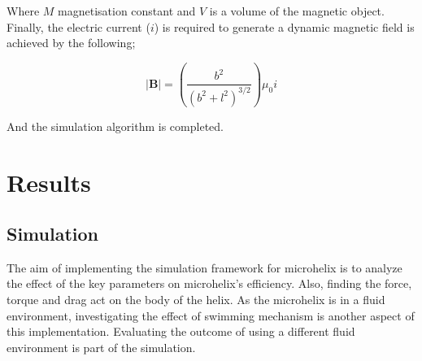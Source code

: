 \documentclass[12pt,a4paper,titlepage]{report}
\begin{document}
Where $M$ magnetisation constant and $V$ is a volume of the magnetic object. Finally, the electric current 
($i$) is required to generate a dynamic magnetic field is achieved by the following; 


\begin{equation}
|\bm{B}| = (\frac{b^2}{(b^2+l^2)^{3/2}}){\mu}_0 i
\label{Current}  
\end{equation}


And the simulation algorithm is completed.

\chapter{Results}\label{result}

\section{Simulation}
The aim of implementing the simulation framework for microhelix is to analyze the effect of 
the key parameters on microhelix\rq{}s efficiency. Also, finding the force, torque and drag act on 
the body of the helix. As the microhelix is in a fluid environment, investigating the effect of swimming
 mechanism is another aspect of this implementation. Evaluating the outcome of using a different fluid 
environment is part of the simulation. 
\end{document}

